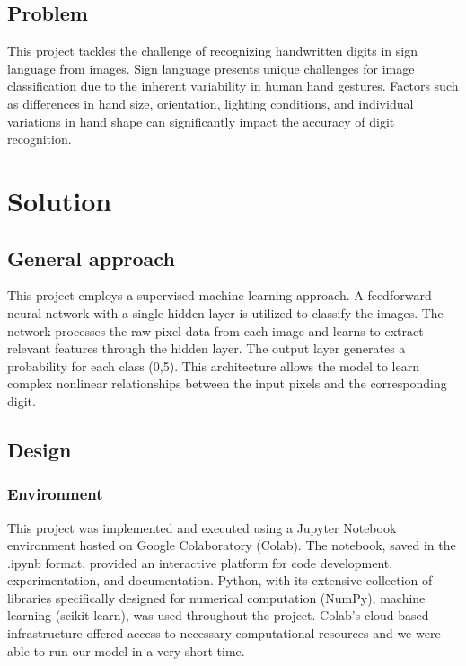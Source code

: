 \documentclass{article}
\begin{document}
\subsection{Problem}
This project tackles the challenge of recognizing handwritten digits in sign language from images. Sign language presents unique challenges for image classification due to the inherent variability in human hand gestures. Factors such as differences in hand size, orientation, lighting conditions, and individual variations in hand shape can significantly impact the accuracy of digit recognition.

\section{Solution}
\subsection{General approach}
This project employs a supervised machine learning approach. A feedforward neural network with a single hidden layer is utilized to classify the images. The network processes the raw pixel data from each image and learns to extract relevant features through the hidden layer. The output layer generates a probability for each class (0,5). This architecture allows the model to learn complex nonlinear relationships between the input pixels and the corresponding digit.

\subsection{Design}

\subsubsection{Environment}
This project was implemented and executed using a Jupyter Notebook environment hosted on Google Colaboratory (Colab). The notebook, saved in the .ipynb format, provided an interactive platform for code development, experimentation, and documentation. Python, with its extensive collection of libraries specifically designed for numerical computation (NumPy), machine learning (scikit-learn), was used throughout the project. Colab's cloud-based infrastructure offered access to necessary computational resources and we were able to run our model in a very short time.
\end{document}

